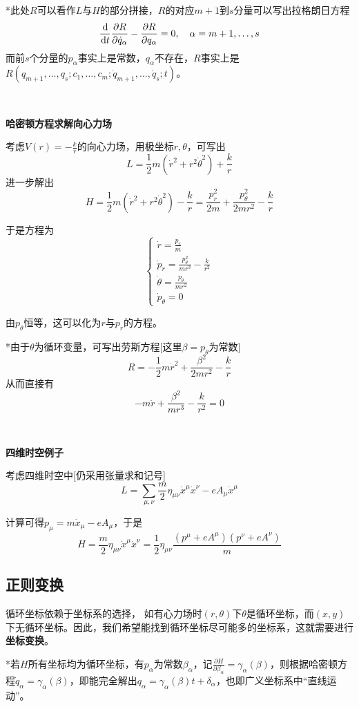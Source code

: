 \documentclass[a4paper,UTF8,fontset=windows]{ctexart}
\newcommand*{\dr}{\hspace{0.07em}\mathrm{d}}
\begin{document}
*此处$R$可以看作$L$与$H$的部分拼接，$R$的对应$m+1$到$s$分量可以写出拉格朗日方程
$$\frac{\dr}{\dr t}\frac{\partial R}{\partial\dot{q}_\alpha}-\frac{\partial R}{\partial q_\alpha}=0,\quad\alpha=m+1,\dots,s$$
而前$s$个分量的$p_\alpha$事实上是常数，$q_\alpha$不存在，$R$事实上是$R(q_{m+1},\dots,q_s;c_1,\dots,c_m;\dot{q}_{m+1},\dots,\dot{q}_s;t)$。

\

\textbf{哈密顿方程求解向心力场}

考虑$V(r)=-\frac{k}{r}$的向心力场，用极坐标$r,\theta$，可写出
$$L=\frac{1}{2}m(\dot{r}^2+r^2\dot{\theta}^2)+\frac{k}{r}$$
进一步解出
$$H=\frac{1}{2}m(\dot{r}^2+r^2\dot{\theta}^2)-\frac{k}{r}=\frac{p_r^2}{2m}+\frac{p_\theta^2}{2mr^2}-\frac{k}{r}$$

于是方程为
$$\begin{cases}\dot{r}=\frac{p_r}{m}\\\dot{p}_r=\frac{p_\theta^2}{mr^3}-\frac{k}{r^2}\\\dot{\theta}=\frac{p_\theta}{mr^2}\\\dot{p}_\theta=0\end{cases}$$

由$p_\theta$恒等，这可以化为$r$与$p_r$的方程。

*由于$\theta$为循环变量，可写出劳斯方程[这里$\beta=p_\theta$为常数]
$$R=-\frac{1}{2}m\dot{r}^2+\frac{\beta^2}{2mr^2}-\frac{k}{r}$$
从而直接有
$$-m\ddot{r}+\frac{\beta^2}{mr^3}-\frac{k}{r^2}=0$$

\

\textbf{四维时空例子}

考虑四维时空中[仍采用张量求和记号]
$$L=\sum_{\mu,\nu}\frac{m}{2}\eta_{\mu\nu}\dot{x}^\mu\dot{x}^\nu-eA_\mu\dot{x}^\mu$$

计算可得$p_\mu=m\dot{x}_\mu-eA_\mu$，于是
$$H=\frac{m}{2}\eta_{\mu\nu}\dot{x}^\mu\dot{x}^\nu=\frac{1}{2}\eta_{\mu\nu}\frac{(p^\mu+eA^\mu)(p^\nu+eA^\nu)}{m}$$

\subsection{正则变换}

循环坐标依赖于坐标系的选择， 如有心力场时$(r,\theta)$下$\theta$是循环坐标，而$(x,y)$下无循环坐标。因此，我们希望能找到循环坐标尽可能多的坐标系，这就需要进行\textbf{坐标变换}。

*若$H$所有坐标均为循环坐标，有$p_\alpha$为常数$\beta_\alpha$，记$\frac{\partial H}{\partial\beta_\alpha}=\gamma_\alpha(\beta)$，则根据哈密顿方程$\dot{q}_\alpha=\gamma_\alpha(\beta)$，即能完全解出$q_\alpha=\gamma_\alpha(\beta)t+\delta_\alpha$，也即广义坐标系中“直线运动”。
\end{document}
